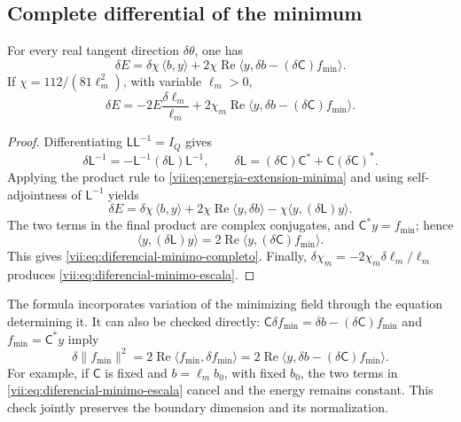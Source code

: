 \subsection{Complete differential of the minimum}
\label{vii:subsec:diferencial-minimo}

\begin{theorem}
\label{vii:thm:diferencial-minimo}
For every real tangent direction \(\delta\theta\), one has
\begin{equation}
 \delta E
 =\delta\chi\,\langle b,y\rangle
   +2\chi\operatorname{Re}
       \langle y,\delta b-(\delta\mathsf C)f_{\min}\rangle.
 \label{vii:eq:diferencial-minimo-completo}
\end{equation}
If \(\chi=112/(81\ell_m^2)\), with variable \(\ell_m>0\),
\begin{equation}
 \delta E=-2E\frac{\delta\ell_m}{\ell_m}
 +2\chi_m\operatorname{Re}
       \langle y,\delta b-(\delta\mathsf C)f_{\min}\rangle.
 \label{vii:eq:diferencial-minimo-escala}
\end{equation}
\end{theorem}

\begin{proof}
Differentiating \(\mathsf L\mathsf L^{-1}=I_Q\) gives
\[
 \delta\mathsf L^{-1}
 =-\mathsf L^{-1}(\delta\mathsf L)\mathsf L^{-1},\qquad
 \delta\mathsf L=(\delta\mathsf C)\mathsf C^*
                      +\mathsf C(\delta\mathsf C)^*.
\]
Applying the product rule to \eqref{vii:eq:energia-extension-minima}
and using self-adjointness of \(\mathsf L^{-1}\) yields
\[
 \delta E=\delta\chi\,\langle b,y\rangle
 +2\chi\operatorname{Re}\langle y,\delta b\rangle
 -\chi\langle y,(\delta\mathsf L)y\rangle.
\]
The two terms in the final product are complex conjugates, and
\(\mathsf C^*y=f_{\min}\); hence
\[
 \langle y,(\delta\mathsf L)y\rangle
 =2\operatorname{Re}\langle y,(\delta\mathsf C)f_{\min}\rangle.
\]
This gives \eqref{vii:eq:diferencial-minimo-completo}.
Finally, \(\delta\chi_m=-2\chi_m\delta\ell_m/\ell_m\)
produces \eqref{vii:eq:diferencial-minimo-escala}.
\end{proof}

The formula incorporates variation of the minimizing field through
the equation determining it. It can also be checked directly:
\(\mathsf C\delta f_{\min}=\delta b-(\delta\mathsf C)f_{\min}\)
and \(f_{\min}=\mathsf C^*y\) imply
\[
 \delta\|f_{\min}\|^2
 =2\operatorname{Re}\langle f_{\min},\delta f_{\min}\rangle
 =2\operatorname{Re}
     \langle y,\delta b-(\delta\mathsf C)f_{\min}\rangle.
\]
For example, if \(\mathsf C\) is fixed and \(b=\ell_m b_0\), with
fixed \(b_0\), the two terms in
\eqref{vii:eq:diferencial-minimo-escala} cancel and the energy
remains constant. This check jointly preserves the boundary dimension
and its normalization.

